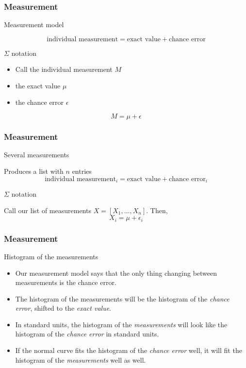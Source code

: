 \documentclass[handout]{beamer}
\begin{document}
   \begin{frame} \frametitle{Measurement}

   \begin{block}
   {Measurement model}

   $$
   \text{individual measurement} = \text{exact value} + \text{chance error}
   $$
   \end{block}

   \begin{block}
   {$\Sigma$ notation}

   \begin{itemize}
   \item Call the individual measurement $M$
   \item the exact value $\mu$
   \item the chance error $\epsilon$
   \end{itemize}

   $$
   M = \mu + \epsilon
   $$
   \end{block}
   \end{frame}


   \begin{frame} \frametitle{Measurement}

   \begin{block}
   {Several measurements}

   Produces a list with $n$ entries
   $$
   \text{individual measurement}_i = \text{exact value} + \text{chance error}_i
   $$
   \end{block}

   \begin{block}
   {$\Sigma$ notation}

   Call our list of measurements $X=[X_1, \dots, X_n]$.
   Then,
   $$
   X_i = \mu + \epsilon_i
   $$
   \end{block}
   \end{frame}


   \begin{frame} \frametitle{Measurement}

   \begin{block}
   {Histogram of the measurements}
   \begin{itemize}
   \item Our measurement model says that the only thing
   changing between measurements is the chance error.
   \item The histogram of the measurements will be the histogram
   of the {\em chance error}, shifted to the {\em exact value}.
   \item In standard units, the histogram of the {\em measurements}
   will look like
   the histogram of the {\em chance error} in standard units.
   \item If the normal curve fits the histogram of the {\em chance error} well,
   it will fit the histogram of the {\em measurements} well as well.
   \end{itemize}
   \end{block}
   \end{frame}
\end{document}
